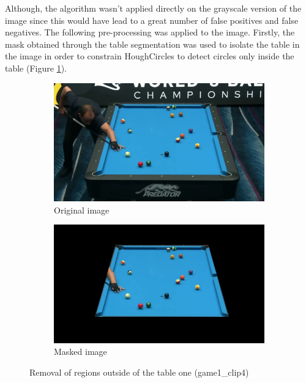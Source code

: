 Although, the algorithm wasn't applied directly on the grayscale version of the image since
this would have lead to a great number of false positives and false negatives. The following
pre-processing was applied to the image.
Firstly, the mask obtained through the table segmentation was used to isolate the table in the image
in order to constrain HoughCircles to detect circles only inside the table (Figure \ref{fig:masking}). \\
\begin{figure}[h]
    \centering
    \begin{subfigure}[b]{0.45\textwidth}
        \centering
        \includegraphics[width=\textwidth]{imgs/ball_localization/original.jpg}
        \caption{Original image}
    \end{subfigure}
    \hspace{0.05\textwidth}
    \begin{subfigure}[b]{0.45\textwidth}
        \centering
        \includegraphics[width=\textwidth]{imgs/ball_localization/masked.jpg}
        \caption{Masked image}
    \end{subfigure}
    \caption{Removal of regions outside of the table one (game1\_clip4)}
    \label{fig:masking}
\end{figure}

